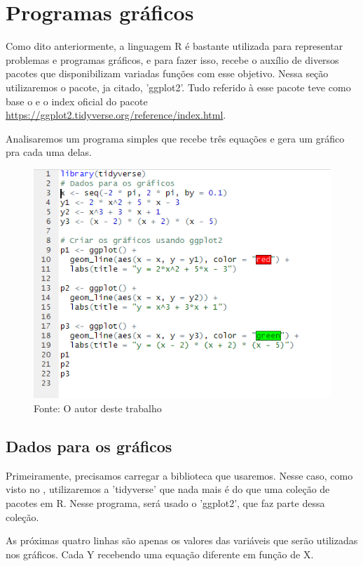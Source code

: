     \section{Programas gr\'{a}ficos}
    Como dito anteriormente, a linguagem R é bastante utilizada para representar problemas e programas gráficos, e para fazer isso, recebe o auxílio de diversos pacotes que disponibilizam variadas funções com esse objetivo. Nessa seção utilizaremos o pacote, ja citado, 'ggplot2'. Tudo referido à esse pacote teve como base o \cite{Wickham2016} e o index oficial do pacote \url{https://ggplot2.tidyverse.org/reference/index.html}.
    \par Analisaremos um programa simples que recebe três equações e gera um gráfico pra cada uma delas.
    \begin{figure}[H]
    	\centering
    	\caption{}
    	\includegraphics[width=1.0\linewidth]{Prints/screenshot020}
    	\label{fig:screenshot020}
    	{\tiny \sf Fonte: O autor deste trabalho }
    \end{figure}
	
	\subsection{Dados para os gráficos}
	Primeiramente, precisamos carregar a biblioteca que usaremos. Nesse caso, como visto no \cite{Wickham2016}, utilizaremos a 'tidyverse' que nada mais é do que uma coleção de pacotes em R. Nesse programa, será usado o 'ggplot2', que faz parte dessa coleção.\par As próximas quatro linhas são apenas os valores das variáveis que serão utilizadas nos gráficos. Cada Y recebendo uma equação diferente em função de X.
    
